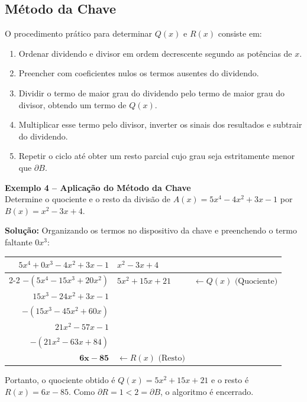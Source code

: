 \documentclass[12pt,a4paper]{article}
\begin{document}
\subsection{Método da Chave}
O procedimento prático para determinar $Q(x)$ e $R(x)$ consiste em:
\begin{enumerate}[label=\arabic*.]
    \item Ordenar dividendo e divisor em ordem decrescente segundo as potências de $x$.
    \item Preencher com coeficientes nulos os termos ausentes do dividendo.
    \item Dividir o termo de maior grau do dividendo pelo termo de maior grau do divisor, obtendo um termo de $Q(x)$.
    \item Multiplicar esse termo pelo divisor, inverter os sinais dos resultados e subtrair do dividendo.
    \item Repetir o ciclo até obter um resto parcial cujo grau seja estritamente menor que $\partial B$.
\end{enumerate}

\begin{destaquebox}
\textbf{Exemplo 4 -- Aplicação do Método da Chave}\\
Determine o quociente e o resto da divisão de $A(x) = 5x^4 - 4x^2 + 3x - 1$ por $B(x) = x^2 - 3x + 4$.

\textbf{Solução:} Organizando os termos no dispositivo da chave e preenchendo o termo faltante $0x^3$:

\vspace{0.3cm}
\begin{center}
\begin{tabular}{r@{\quad}l@{\quad}l}
$5x^4 + 0x^3 - 4x^2 + 3x - 1$ & \multicolumn{1}{|l}{$x^2 - 3x + 4$} & \\ \cline{2-2}
\underline{$-(5x^4 - 15x^3 + 20x^2)$} & $5x^2 + 15x + 21$ & $\leftarrow Q(x) \text{ (Quociente)}$ \\
$15x^3 - 24x^2 + 3x - 1$ & & \\
\underline{$-(15x^3 - 45x^2 + 60x)$} & & \\
$21x^2 - 57x - 1$ & & \\
\underline{$-(21x^2 - 63x + 84)$} & & \\
$\mathbf{6x - 85}$ & $\leftarrow R(x) \text{ (Resto)}$ & 
\end{tabular}
\end{center}
\vspace{0.3cm}

Portanto, o quociente obtido é $Q(x) = 5x^2 + 15x + 21$ e o resto é $R(x) = 6x - 85$. Como $\partial R = 1 < 2 = \partial B$, o algoritmo é encerrado.
\end{destaquebox}
\end{document}
